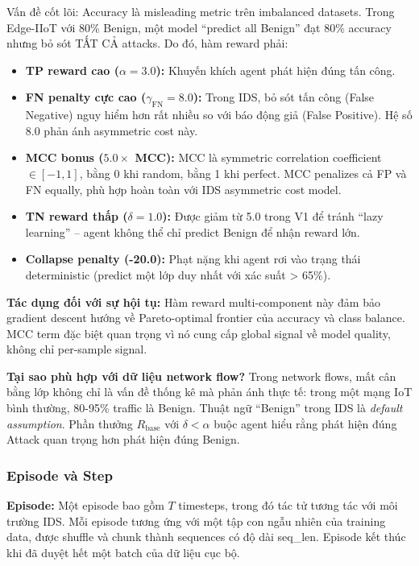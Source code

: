 \documentclass[12pt,a4paper]{article}
\begin{document}
Vấn đề cốt lõi: Accuracy là misleading metric trên imbalanced datasets. Trong Edge-IIoT với 80\% Benign, một model ``predict all Benign'' đạt 80\% accuracy nhưng bỏ sót TẤT CẢ attacks. Do đó, hàm reward phải:
\begin{itemize}
    \item \textbf{TP reward cao ($\alpha=3.0$):} Khuyến khích agent phát hiện đúng tấn công.
    \item \textbf{FN penalty cực cao ($\gamma_{\text{FN}}=8.0$):} Trong IDS, bỏ sót tấn công (False Negative) nguy hiểm hơn rất nhiều so với báo động giả (False Positive). Hệ số 8.0 phản ánh asymmetric cost này.
    \item \textbf{MCC bonus ($5.0 \times$ MCC):} MCC là symmetric correlation coefficient $\in [-1, 1]$, bằng 0 khi random, bằng 1 khi perfect. MCC penalizes cả FP và FN equally, phù hợp hoàn toàn với IDS asymmetric cost model.
    \item \textbf{TN reward thấp ($\delta=1.0$):} Được giảm từ 5.0 trong V1 để tránh ``lazy learning'' -- agent không thể chỉ predict Benign để nhận reward lớn.
    \item \textbf{Collapse penalty (-20.0):} Phạt nặng khi agent rơi vào trạng thái deterministic (predict một lớp duy nhất với xác suất > 65\%).
\end{itemize}

\textbf{Tác dụng đối với sự hội tụ:} Hàm reward multi-component này đảm bảo gradient descent hướng về Pareto-optimal frontier của accuracy và class balance. MCC term đặc biệt quan trọng vì nó cung cấp global signal về model quality, không chỉ per-sample signal.

\textbf{Tại sao phù hợp với dữ liệu network flow?} Trong network flows, mất cân bằng lớp không chỉ là vấn đề thống kê mà phản ánh thực tế: trong một mạng IoT bình thường, 80-95\% traffic là Benign. Thuật ngữ ``Benign'' trong IDS là \textit{default assumption}. Phần thưởng $R_{\text{base}}$ với $\delta < \alpha$ buộc agent hiểu rằng phát hiện đúng Attack quan trọng hơn phát hiện đúng Benign.

\subsubsection{Episode và Step}

\textbf{Episode:} Một episode bao gồm $T$ timesteps, trong đó tác tử tương tác với môi trường IDS. Mỗi episode tương ứng với một tập con ngẫu nhiên của training data, được shuffle và chunk thành sequences có độ dài seq\_len. Episode kết thúc khi đã duyệt hết một batch của dữ liệu cục bộ.
\end{document}
